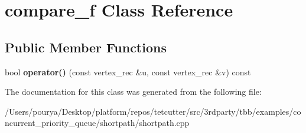 \hypertarget{classcompare__f}{}\section{compare\+\_\+f Class Reference}
\label{classcompare__f}
\subsection*{Public Member Functions}
\begin{DoxyCompactItemize}
\item 
\hypertarget{classcompare__f_a56ead5edb5dd633ca882370d88fbb403}{}bool {\bfseries operator()} (const vertex\+\_\+rec \&u, const vertex\+\_\+rec \&v) const \label{classcompare__f_a56ead5edb5dd633ca882370d88fbb403}

\end{DoxyCompactItemize}


The documentation for this class was generated from the following file\+:\begin{DoxyCompactItemize}
\item 
/\+Users/pourya/\+Desktop/platform/repos/tetcutter/src/3rdparty/tbb/examples/concurrent\+\_\+priority\+\_\+queue/shortpath/shortpath.\+cpp\end{DoxyCompactItemize}

